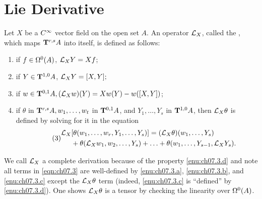 \documentclass[../main]{subfiles}
\begin{document}
\section{Lie Derivative}\label{ch07:s3}
Let $X$ be a $\CInfty$ vector field on the open set $A$. An operator $\liederiv{X}$, called the , which maps $\tensorbundle{A}{r}{ s}$ into itself, is defined as follows: 
\begin{enumerate}[label=(\alph*)]
    \item\label{enu:ch07.3.a} if $f\in \formbundle{A}{0}$, $\liederiv{X}{Y} = Xf$;
    \item\label{enu:ch07.3.b} if $Y\in\tensorbundle{A}{1}{0}$, $\liederiv{X}{Y}=[X, Y];$
    \item\label{enu:ch07.3.c} if $w\in\tensorbundle{A}{0}{1},(\liederiv{X}{w})(Y)=X w(Y)-w([X, Y])$;
    \item\label{enu:ch07.3.d} if $\theta$ in $\tensorbundle{A}{r}{ s}, w_{1}, \ldots, w_{t}$ in $\tensorbundle{A}{0}{1}$, and $Y_{1}, \ldots, Y_{s}$ in $\tensorbundle{A}{1}{ 0}$, then $\liederiv{X} \theta$ is defined by solving for it in the equation
\begin{equation}\tag{3}
\label{eqn:ch07.3}
\begin{split}
\liederiv{X}&{[\theta(w_{1}, \ldots, w_{r}, Y_{1}, \ldots, Y_{s})]} = (\liederiv{X}{\theta})(w_{1}, \ldots, Y_{s}) \\ &+ \theta (\liederiv{X} w_1, w_{2}, \ldots, Y_{s})+\ldots+\theta(w_{1}, \ldots, Y_{s-1}, \liederiv{X} Y_{s}).
\end{split}
\end{equation}

\end{enumerate}
We call $\liederiv{X}$ a complete derivation because of the property \ref{enu:ch07.3.d} and note all terms in \ref{eqn:ch07.3} are well-defined by \ref{enu:ch07.3.a}, \ref{enu:ch07.3.b}, and \ref{enu:ch07.3.c} except the $\liederiv{X} \theta$ term (indeed, \ref{enu:ch07.3.c} is ``defined'' by \ref{enu:ch07.3.d}). One shows $\liederiv{X} \theta$ is a tensor by checking the linearity over $\formbundle{A}{0}$.
\end{document}
